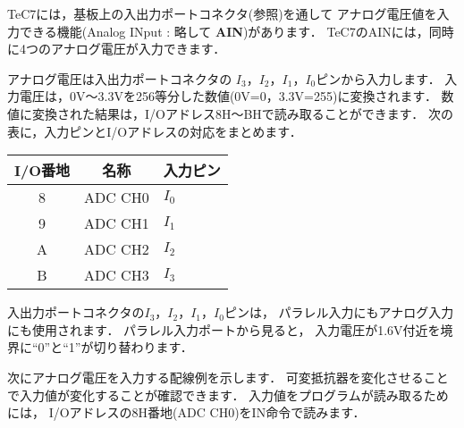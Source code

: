 TeC7には，基板上の入出力ポートコネクタ(参照)を通して
アナログ電圧値を入力できる機能(Analog INput : 略して {\bf AIN})があります．
TeC7のAINには，同時に4つのアナログ電圧が入力できます．

アナログ電圧は入出力ポートコネクタの
$I_3$，$I_2$，$I_1$，$I_0$ピンから入力します．
入力電圧は，0V〜3.3Vを256等分した数値(0V=0，3.3V=255)に変換されます．
数値に変換された結果は，I/Oアドレス8H〜BHで読み取ることができます．
次の表に，入力ピンとI/Oアドレスの対応をまとめます．

\begin{center}
\begin{tabular}{|c|l|l|}
\hline
I/O番地 & \multicolumn{1}{|c|}{名称} & \multicolumn{1}{|c|}{入力ピン} \\
\hline
8 & ADC CH0  & $I_0$ \\
9 & ADC CH1  & $I_1$ \\
A & ADC CH2  & $I_2$ \\
B & ADC CH3  & $I_3$ \\
\hline
\end{tabular}
\end{center}

入出力ポートコネクタの$I_3$，$I_2$，$I_1$，$I_0$ピンは，
パラレル入力にもアナログ入力にも使用されます．
パラレル入力ポートから見ると，
入力電圧が1.6V付近を境界に``0''と``1''が切り替わります．

次にアナログ電圧を入力する配線例を示します．
可変抵抗器を変化させることで入力値が変化することが確認できます．
入力値をプログラムが読み取るためには，
I/Oアドレスの8H番地(ADC CH0)をIN命令で読みます．

\begin{center}
\epsfxsize=4cm
\end{center}

\vfill
\begin{center}
\end{center}

